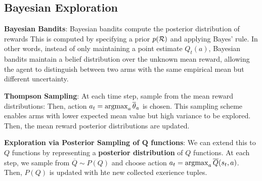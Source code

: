 \documentclass{article}
\begin{document}
\subsection{Bayesian Exploration}

  \textbf{Bayesian Bandits}: Bayesian bandits compute the posterior distribution of rewards
  This is computed by specifying a prior $p(\mathcal{R})$ and applying Bayes' rule. In other words, instead of only maintaining a point estimate $Q_t(a)$, Bayesian bandits maintain a belief distribution over the unknown mean reward, allowing the agent to distinguish between two arms with the same empirical mean but different uncertainty.

  \textbf{Thompson Sampling}: At each time step, sample from the mean reward distributions:
  Then, action $a_t=\operatorname*{argmax}_a \overline{\theta}_a$ is chosen. This sampling scheme enables arms with lower expected mean value but high variance to be explored. Then, the mean reward posterior distributions are updated.

  \textbf{Exploration via Posterior Sampling of $\boldsymbol{Q}$ functions}: We can extend this to $Q$ functions by representing a \textbf{posterior distribution} of $Q$ functions. At each step, we sample from $\overline{Q}\sim P(Q)$ and choose action $a_t=\operatorname*{argmax}_a \overline{Q}(s_t,a)$. Then, $P(Q)$ is updated with hte new collected exerience tuples.
\end{document}
